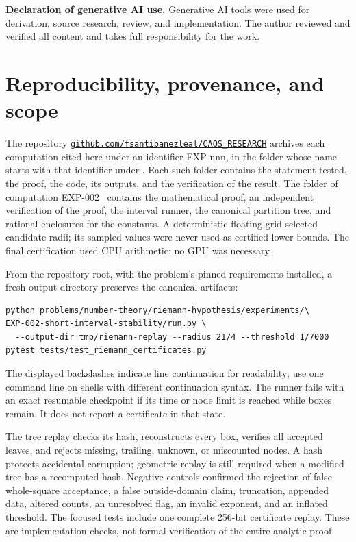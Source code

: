 \documentclass[11pt]{article}
\theoremstyle{remark}
\begin{document}
\medskip
\noindent\textbf{Declaration of generative AI use.} Generative AI tools
were used for derivation, source research, review, and implementation.
The author reviewed and verified all content and takes full
responsibility for the work.

\appendix
\section{Reproducibility, provenance, and scope}

The repository
\href{https://github.com/fsantibanezleal/CAOS_RESEARCH}{\nolinkurl{github.com/fsantibanezleal/CAOS_RESEARCH}}
archives each computation cited here under an identifier EXP-nnn, in the
folder whose name starts with that identifier under
. Each such
folder contains the statement tested, the proof, the code, its outputs,
and the verification of the result. The folder of computation
EXP-002~\cite{Record} contains the mathematical proof, an independent
verification of the proof, the interval runner, the canonical partition
tree, and rational enclosures for the constants. A
deterministic floating grid selected candidate radii; its sampled values
were never used as certified lower bounds. The final certification used
CPU arithmetic; no GPU was necessary.

From the repository root, with the problem's pinned requirements installed,
a fresh output directory preserves the canonical artifacts:
\begin{verbatim}
python problems/number-theory/riemann-hypothesis/experiments/\
EXP-002-short-interval-stability/run.py \
  --output-dir tmp/riemann-replay --radius 21/4 --threshold 1/7000
pytest tests/test_riemann_certificates.py
\end{verbatim}
The displayed backslashes indicate line continuation for readability;
use one command line on shells with different continuation syntax.
The runner fails with an exact resumable checkpoint if its time or node
limit is reached while boxes remain. It does not report a certificate in
that state.

The tree replay checks its hash, reconstructs every box, verifies all
accepted leaves, and rejects missing, trailing, unknown, or miscounted
nodes. A hash protects accidental corruption; geometric replay is still
required when a modified tree has a recomputed hash. Negative controls
confirmed the rejection of false whole-square acceptance, a false
outside-domain claim, truncation, appended data, altered counts, an
unresolved flag, an invalid exponent, and an inflated threshold. The
focused tests include one complete 256-bit certificate replay. These are
implementation checks, not formal verification of the entire analytic
proof.
\end{document}
